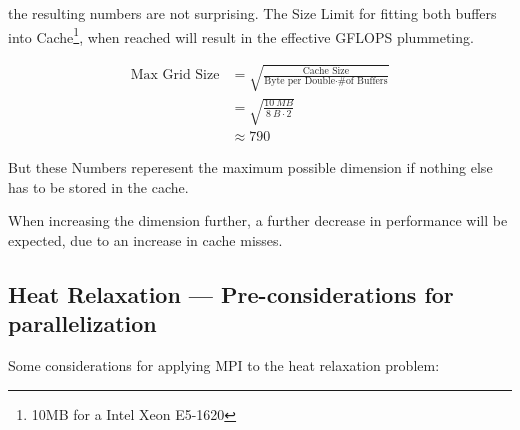 \documentclass[]{scrartcl}
\begin{document}
the resulting numbers are not surprising.
The Size Limit for fitting both buffers into Cache\footnote{10MB for a Intel Xeon E5-1620}, when reached will result in the effective GFLOPS plummeting.


\begin{align}
    \text{Max Grid Size} &= \sqrt{\frac{\text{Cache Size}}{\text{Byte per Double} \cdot \text{\# of Buffers}}}\\
                                  &= \sqrt{\frac{\SI{10}{MB}}{\SI{8}{B}\cdot 2}}\\
                                  &\approx 790
\end{align}

But these Numbers reperesent the maximum possible dimension if nothing else has to be stored in the cache.

When increasing the dimension further, a further decrease in performance will be expected, due to an increase in cache misses.

\subsection{Heat Relaxation --- Pre-considerations for parallelization}
Some considerations for applying MPI to the heat relaxation problem:
\end{document}
